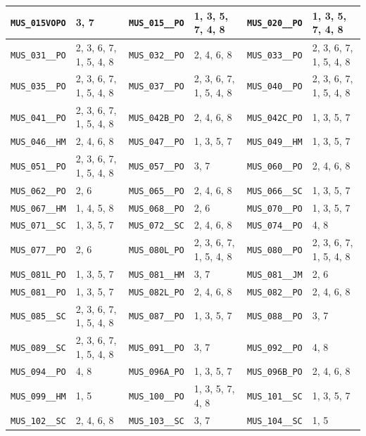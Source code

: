 \begin{longtable}{|l|l||l|l||l|l|}
    \verb|MUS_015VOPO| & 3, 7 & \verb|MUS_015__PO| & 1, 3, 5, 7, 4, 8 & \verb|MUS_020__PO| & 1, 3, 5, 7, 4, 8\\\hline
    \verb|MUS_031__PO| & 2, 3, 6, 7, 1, 5, 4, 8 & \verb|MUS_032__PO| & 2, 4, 6, 8 & \verb|MUS_033__PO| & 2, 3, 6, 7, 1, 5, 4, 8\\\hline
    \verb|MUS_035__PO| & 2, 3, 6, 7, 1, 5, 4, 8 & \verb|MUS_037__PO| & 2, 3, 6, 7, 1, 5, 4, 8 & \verb|MUS_040__PO| & 2, 3, 6, 7, 1, 5, 4, 8\\\hline
    \verb|MUS_041__PO| & 2, 3, 6, 7, 1, 5, 4, 8 & \verb|MUS_042B_PO| & 2, 4, 6, 8 & \verb|MUS_042C_PO| & 1, 3, 5, 7\\\hline
    \verb|MUS_046__HM| & 2, 4, 6, 8 & \verb|MUS_047__PO| & 1, 3, 5, 7 & \verb|MUS_049__HM| & 1, 3, 5, 7\\\hline
    \verb|MUS_051__PO| & 2, 3, 6, 7, 1, 5, 4, 8 & \verb|MUS_057__PO| & 3, 7 & \verb|MUS_060__PO| & 2, 4, 6, 8\\\hline
    \verb|MUS_062__PO| & 2, 6 & \verb|MUS_065__PO| & 2, 4, 6, 8 & \verb|MUS_066__SC| & 1, 3, 5, 7\\\hline
    \verb|MUS_067__HM| & 1, 4, 5, 8 & \verb|MUS_068__PO| & 2, 6 & \verb|MUS_070__PO| & 1, 3, 5, 7\\\hline
    \verb|MUS_071__SC| & 1, 3, 5, 7 & \verb|MUS_072__SC| & 2, 4, 6, 8 & \verb|MUS_074__PO| & 4, 8\\\hline
    \verb|MUS_077__PO| & 2, 6 & \verb|MUS_080L_PO| & 2, 3, 6, 7, 1, 5, 4, 8 & \verb|MUS_080__PO| & 2, 3, 6, 7, 1, 5, 4, 8\\\hline
    \verb|MUS_081L_PO| & 1, 3, 5, 7 & \verb|MUS_081__HM| & 3, 7 & \verb|MUS_081__JM| & 2, 6\\\hline
    \verb|MUS_081__PO| & 1, 3, 5, 7 & \verb|MUS_082L_PO| & 2, 4, 6, 8 & \verb|MUS_082__PO| & 2, 4, 6, 8\\\hline
    \verb|MUS_085__SC| & 2, 3, 6, 7, 1, 5, 4, 8 & \verb|MUS_087__PO| & 1, 3, 5, 7 & \verb|MUS_088__PO| & 3, 7\\\hline
    \verb|MUS_089__SC| & 2, 3, 6, 7, 1, 5, 4, 8 & \verb|MUS_091__PO| & 3, 7 & \verb|MUS_092__PO| & 4, 8\\\hline
    \verb|MUS_094__PO| & 4, 8 & \verb|MUS_096A_PO| & 1, 3, 5, 7 & \verb|MUS_096B_PO| & 2, 4, 6, 8\\\hline
    \verb|MUS_099__HM| & 1, 5 & \verb|MUS_100__PO| & 1, 3, 5, 7, 4, 8 & \verb|MUS_101__SC| & 1, 3, 5, 7\\\hline
    \verb|MUS_102__SC| & 2, 4, 6, 8 & \verb|MUS_103__SC| & 3, 7 & \verb|MUS_104__SC| & 1, 5\\\hline

\end{longtable}
